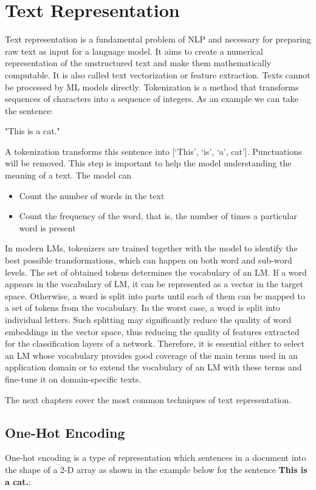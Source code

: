 \section{Text Representation}
Text representation is a fundamental problem of NLP and necessary for preparing raw text as input for a language model. It aims to create a numerical representation of the unstructured text and make them mathematically computable. It is also called text vectorization or feature extraction.\newline
Texts cannot be processed by ML models directly. Tokenization is a method that transforms sequences of characters into a sequence of integers. As an example we can take the sentence: \newline

\centerline{"This is a cat."} 

A tokenization transforms this sentence into [‘This’, ‘is’, ‘a’, cat’]. Punctuations will be removed. This step is important to help the model understanding the meaning of a text. The model can
\begin{itemize}
	\item Count the number of words in the text
	\item Count the frequency of the word, that is, the number of times a particular word is present
\end{itemize} 

In modern LMs, tokenizers are trained together with the model to identify the best possible transformations, which can happen on both word and sub-word levels. The set of obtained tokens determines the vocabulary of an LM. If a word appears in the vocabulary of LM, it can be represented as a vector in the target space. Otherwise, a word is split into parts until each of them can be mapped to a set of tokens from the vocabulary. In the worst case, a word is split into individual letters. Such splitting may significantly reduce the quality of word embeddings in the vector space, thus reducing the quality of features extracted for the classification layers of a network. Therefore, it is essential either to select an LM whose vocabulary provides good coverage of the main terms used in an application domain or to extend the vocabulary of an LM with these terms and fine-tune it on domain-specific texts. 

The next chapters cover the most common techniques of text representation.

\subsection{One-Hot Encoding}
One-hot encoding is a type of representation which sentences in a document into the shape of a 2-D array as shown in the example below for the sentence \textbf{This is a cat.}:

